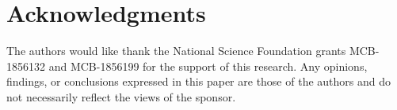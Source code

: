 \documentclass[10pt,letterpaper]{article}
\begin{document}
\section*{Acknowledgments}
The authors would like thank the National Science Foundation grants MCB-1856132 and MCB-1856199 for the support of this research. Any opinions, findings, or conclusions expressed in this paper are those of the authors and do not necessarily reflect the views of the sponsor.

\nolinenumbers

%
%
% 

% 
\end{document}
